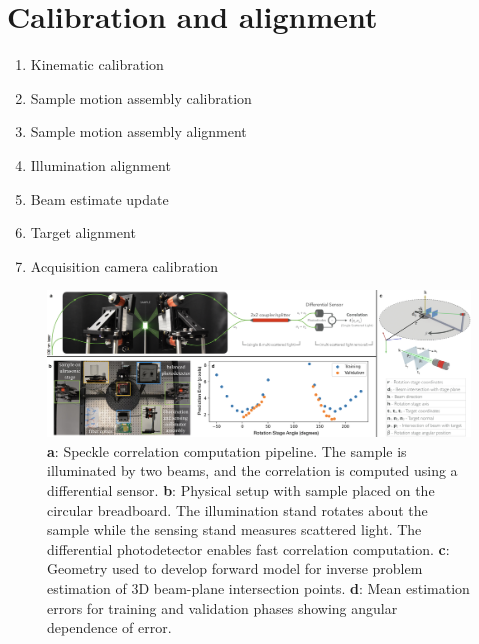 
\section{Calibration and alignment}

\begin{enumerate}
    \item Kinematic calibration
    \item Sample motion assembly calibration
    \item Sample motion assembly alignment
    \item Illumination alignment
    \item Beam estimate update
    \item Target alignment
    \item Acquisition camera calibration
\end{enumerate}


\begin{figure}
    \centering
    \includegraphics[width=\textwidth]{../figures/experiment.png}
    \caption{\textbf{a}: Speckle correlation computation pipeline. The sample is illuminated by two beams, and the correlation is computed using a differential sensor. \textbf{b}: Physical setup with sample placed on the circular breadboard. The illumination stand rotates about the sample while the sensing stand measures scattered light. The differential photodetector enables fast correlation computation. \textbf{c}: Geometry used to develop forward model for inverse problem estimation of 3D beam-plane intersection points. \textbf{d}: Mean estimation errors for training and validation phases showing angular dependence of error.}
    \label{fig:3}
\end{figure}

